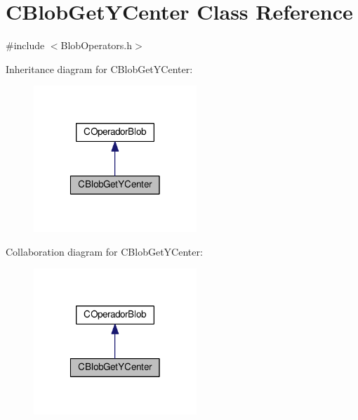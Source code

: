\hypertarget{classCBlobGetYCenter}{\section{C\-Blob\-Get\-Y\-Center Class Reference}
\label{classCBlobGetYCenter}
}


{\ttfamily \#include $<$Blob\-Operators.\-h$>$}



Inheritance diagram for C\-Blob\-Get\-Y\-Center\-:\nopagebreak
\begin{figure}[H]
\begin{center}
\leavevmode
\includegraphics[width=174pt]{classCBlobGetYCenter__inherit__graph}
\end{center}
\end{figure}


Collaboration diagram for C\-Blob\-Get\-Y\-Center\-:\nopagebreak
\begin{figure}[H]
\begin{center}
\leavevmode
\includegraphics[width=174pt]{classCBlobGetYCenter__coll__graph}
\end{center}
\end{figure}
